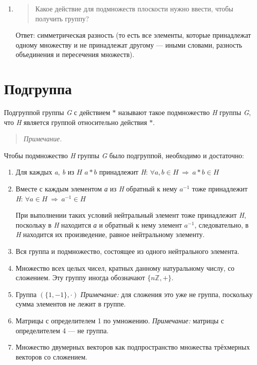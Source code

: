 \documentclass[12pt]{article}
\begin{document}
\begin{enumerate}
    \item
          \begin{quote}
              Какое действие для подмножеств плоскости нужно ввести, чтобы получить
              группу?
          \end{quote}

          Ответ: симметрическая разность (то есть все элементы, которые
          принадлежат одному множеству и не принадлежат другому --- иными словами,
          разность объединения и пересечения множеств).
\end{enumerate}

\section{Подгруппа}

Подгруппой группы \emph{G} с действием $*$ называют такое подмножество
\emph{H} группы \emph{G}, что \emph{H} является группой относительно
действия $*$.

\begin{quote}
    \emph{Примечание.}
\end{quote}

Чтобы подмножество \emph{H} группы \emph{G} было подгруппой, необходимо
и достаточно:

\begin{enumerate}
    \item
          Для каждых \emph{a}, \emph{b} из $H$ $a * b$ принадлежит \emph{H}: $\forall a, b \in H \ \Rightarrow \ a * b \in H$
    \item
          Вместе с каждым элементом \emph{а} из \emph{H} обратный к нему $a^{-1}$ тоже принадлежит \emph{H}: $\forall a \in H \ \Rightarrow \ a^{-1} \in H$

          При выполнении таких условий нейтральный элемент тоже принадлежит
          \emph{H}, поскольку в \emph{H} находится \emph{а} и обратный к нему
          элемент $a^{-1}$, следовательно, в \emph{H} находится их
          произведение, равное нейтральному элементу.

    \item
          Вся группа и подмножество, состоящее из одного нейтрального элемента.
    \item
          Множество всех целых чисел, кратных данному натуральному числу, со сложением. Эту группу иногда обозначают $\{n\mathbb{Z}, +\}$.
    \item
          Группа $(\{1, −1\}, \cdot)$ \emph{Примечание:} для сложения это уже не группа, поскольку сумма элементов не лежит в группе.
    \item
          Матрицы с определителем 1 по умножению. \emph{Примечание:} матрицы с
          определителем 4 --- не группа.
    \item
          Множество двумерных векторов как подпространство множества трёхмерных
          векторов со сложением.
\end{enumerate}
\end{document}
